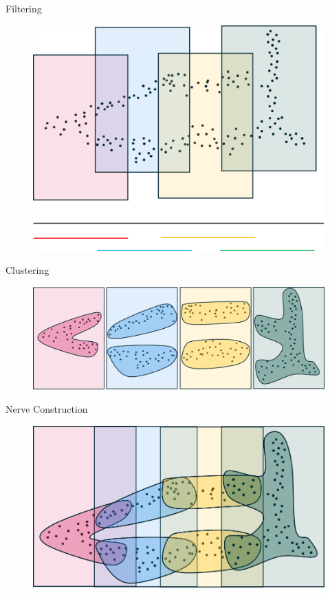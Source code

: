 \documentclass{beamer}
\begin{document}
\begin{frame}{Filtering}
  \begin{figure}
    \begin{center}
      \includegraphics[width=.8\textwidth]{filteredposterdata.png}
    \end{center}
  \end{figure}
\end{frame}

\begin{frame}{Clustering}
  \begin{figure}
    \begin{center}
      \includegraphics[width=1\textwidth]{posterdataclusters.png}
    \end{center}
  \end{figure}
\end{frame}

\begin{frame}{Nerve Construction}
  \begin{figure}
    \begin{center}
      \includegraphics[width=.8\textwidth]{intersectposterdata.png}
    \end{center}
  \end{figure}
\end{frame}
\end{document}
